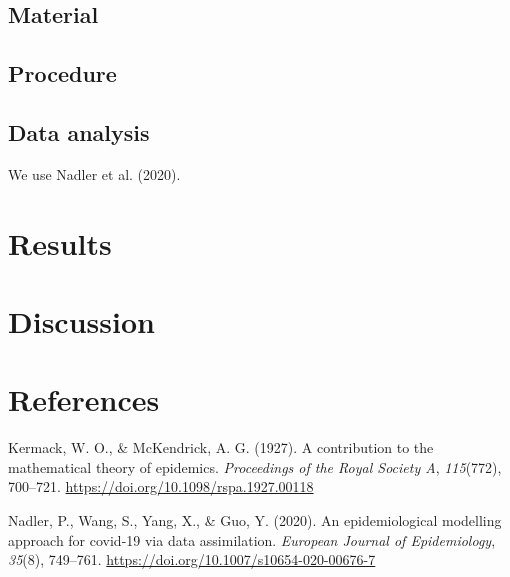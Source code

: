\documentclass[
  english,
  doc]{apa6}
\begin{document}
\hypertarget{material}{%
\subsection{Material}\label{material}}

\hypertarget{procedure}{%
\subsection{Procedure}\label{procedure}}

\hypertarget{data-analysis}{%
\subsection{Data analysis}\label{data-analysis}}

We use Nadler et al. (2020).

\hypertarget{results}{%
\section{Results}\label{results}}

\hypertarget{discussion}{%
\section{Discussion}\label{discussion}}

\newpage

\hypertarget{references}{%
\section{References}\label{references}}

\begingroup
\setlength{\parindent}{-0.5in}
\setlength{\leftskip}{0.5in}

\hypertarget{refs}{}
\leavevmode\hypertarget{ref-kermack}{}%
Kermack, W. O., \& McKendrick, A. G. (1927). A contribution to the mathematical theory of epidemics. \emph{Proceedings of the Royal Society A}, \emph{115}(772), 700--721. \url{https://doi.org/10.1098/rspa.1927.00118}

\leavevmode\hypertarget{ref-assim}{}%
Nadler, P., Wang, S., Yang, X., \& Guo, Y. (2020). An epidemiological modelling approach for covid-19 via data assimilation. \emph{European Journal of Epidemiology}, \emph{35}(8), 749--761. \url{https://doi.org/10.1007/s10654-020-00676-7}

\endgroup
\end{document}
